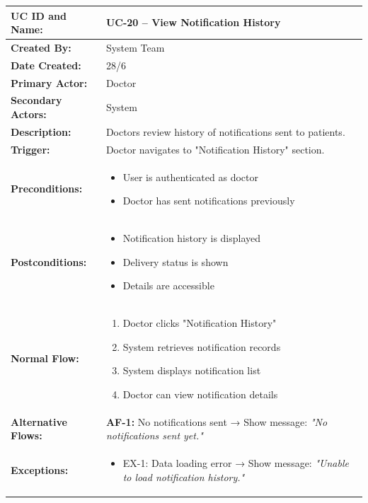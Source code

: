 \documentclass[12pt,a4paper]{article}
\begin{document}
\renewcommand{\arraystretch}{1.5}
\begin{longtable}{|p{4.5cm}|p{10.5cm}|}
\hline
\textbf{UC ID and Name:} & UC-20 – View Notification History \\
\hline
\textbf{Created By:} & System Team \\
\hline
\textbf{Date Created:} & 28/6 \\
\hline
\textbf{Primary Actor:} & Doctor \\
\hline
\textbf{Secondary Actors:} & System \\
\hline
\textbf{Description:} & Doctors review history of notifications sent to patients. \\
\hline
\textbf{Trigger:} & Doctor navigates to "Notification History" section. \\
\hline
\textbf{Preconditions:} &
\begin{itemize}
  \item User is authenticated as doctor
  \item Doctor has sent notifications previously
\end{itemize} \\
\hline
\textbf{Postconditions:} &
\begin{itemize}
  \item Notification history is displayed
  \item Delivery status is shown
  \item Details are accessible
\end{itemize} \\
\hline
\textbf{Normal Flow:} &
\begin{enumerate}
  \item Doctor clicks "Notification History"
  \item System retrieves notification records
  \item System displays notification list
  \item Doctor can view notification details
\end{enumerate} \\
\hline
\textbf{Alternative Flows:} &
\textbf{AF-1:} No notifications sent → Show message: \textit{"No notifications sent yet."} \\
\hline
\textbf{Exceptions:} &
\begin{itemize}
  \item EX-1: Data loading error → Show message: \textit{"Unable to load notification history."}
\end{itemize} \\
\hline

\end{longtable}
\end{document}
